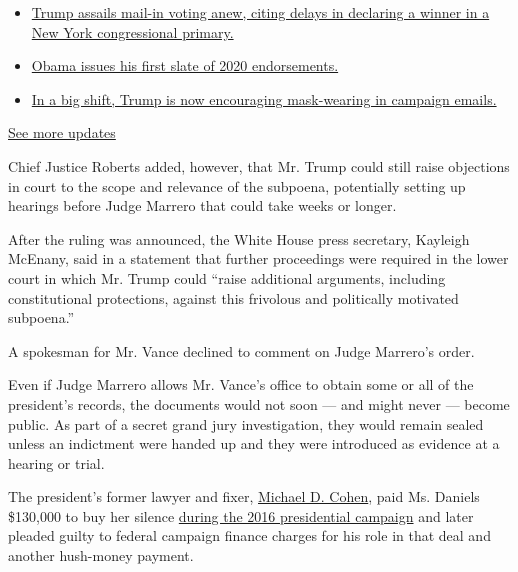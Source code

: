 \begin{itemize}
\tightlist
\item
  \href{https://www.nytimes3xbfgragh.onion/2020/08/03/us/elections/biden-vs-trump.html?action=click\&pgtype=Article\&state=default\&region=MAIN_CONTENT_1\&context=storylines_live_updates\#link-6494b448}{Trump
  assails mail-in voting anew, citing delays in declaring a winner in a
  New York congressional primary.}
\item
  \href{https://www.nytimes3xbfgragh.onion/2020/08/03/us/elections/biden-vs-trump.html?action=click\&pgtype=Article\&state=default\&region=MAIN_CONTENT_1\&context=storylines_live_updates\#link-3de249e6}{Obama
  issues his first slate of 2020 endorsements.}
\item
  \href{https://www.nytimes3xbfgragh.onion/2020/08/03/us/elections/biden-vs-trump.html?action=click\&pgtype=Article\&state=default\&region=MAIN_CONTENT_1\&context=storylines_live_updates\#link-54e34d20}{In
  a big shift, Trump is now encouraging mask-wearing in campaign
  emails.}
\end{itemize}

\href{https://www.nytimes3xbfgragh.onion/2020/08/03/us/elections/biden-vs-trump.html?action=click\&pgtype=Article\&state=default\&region=MAIN_CONTENT_1\&context=storylines_live_updates}{See
more updates}

Chief Justice Roberts added, however, that Mr. Trump could still raise
objections in court to the scope and relevance of the subpoena,
potentially setting up hearings before Judge Marrero that could take
weeks or longer.

After the ruling was announced, the White House press secretary,
Kayleigh McEnany, said in a statement that further proceedings were
required in the lower court in which Mr. Trump could ``raise additional
arguments, including constitutional protections, against this frivolous
and politically motivated subpoena.''

A spokesman for Mr. Vance declined to comment on Judge Marrero's order.

Even if Judge Marrero allows Mr. Vance's office to obtain some or all of
the president's records, the documents would not soon --- and might
never --- become public. As part of a secret grand jury investigation,
they would remain sealed unless an indictment were handed up and they
were introduced as evidence at a hearing or trial.

The president's former lawyer and fixer,
\href{https://www.nytimes3xbfgragh.onion/2020/07/22/nyregion/michael-cohen-donald-trump-prison.html}{Michael
D. Cohen}, paid Ms. Daniels \$130,000 to buy her silence
\href{https://www.nytimes3xbfgragh.onion/2019/08/01/nyregion/trump-cohen-stormy-daniels-vance.html}{during
the 2016 presidential campaign} and later pleaded guilty to federal
campaign finance charges for his role in that deal and another
hush-money payment.

